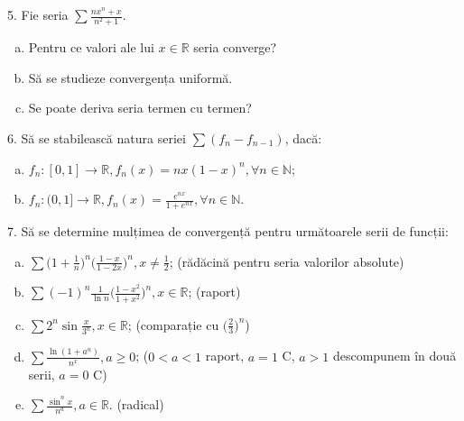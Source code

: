 \documentclass[11pt,a4paper]{article}
\newcommand\NN{\mathbb{N}}
\newcommand\RR{\mathbb{R}}
\theoremstyle{dotless}
\theoremstyle{dotlessdr}
\begin{document}
\vspace{1cm}

5. Fie seria $\sum \frac{nx^n + x}{n^2 + 1}$.
\begin{enumerate}[(a)]
\item Pentru ce valori ale lui $x \in \RR$ seria converge?
\item Să se studieze convergența uniformă.
\item Se poate deriva seria termen cu termen?
\end{enumerate}

6. Să se stabilească natura seriei $\sum (f_n - f_{n-1})$, dacă:
\begin{enumerate}[(a)]
\item $f_n : [0, 1] \to \RR, f_n(x) = nx(1 - x)^n, \forall n \in \NN$;
\item $f_n : (0, 1] \to \RR, f_n(x) = \frac{e^{nx}}{1 + e^{nx}}, \forall n \in \NN$.
\end{enumerate}

\vspace{1cm}

7. Să se determine mulțimea de convergență pentru următoarele serii de funcții:
\begin{enumerate}[(a)]
\item $\sum \Big( 1 + \frac{1}{n} \Big)^n \Big( \frac{1 - x}{1 - 2x} \Big)^n, x \neq \frac{1}{2}$;
  (rădăcină pentru seria valorilor absolute)
\item $\sum (-1)^n \frac{1}{\ln n} \Big( \frac{1 - x^2}{1 + x^2} \Big)^n, x \in \RR$; (raport)
\item $\sum 2^n \sin \frac{x}{3^n}, x \in \RR$; (comparație cu $\Big( \frac{2}{3} \Big)^n$)
\item $\sum \frac{\ln(1 + a^n)}{n^x}, a \geq 0$; ($0 < a < 1$ raport, $a = 1$ C, $a > 1$ descompunem în două serii, $a = 0$ C)
\item $\sum \frac{\sin^n x}{n^a}, a \in \RR$. (radical)
\end{enumerate}
\end{document}
